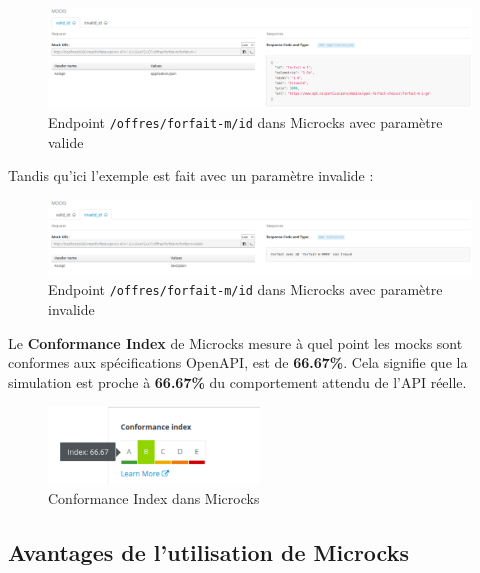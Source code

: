 \documentclass[11pt]{article}
\begin{document}
		\begin{figure}[H]
			\centering
			\includegraphics[width=\textwidth]{asset/mock_forfaitm.png}
			\caption{Endpoint \texttt{/offres/forfait-m/{id}} dans Microcks avec paramètre valide}
			\label{fig:endpoint-offres/forfait-m/{id}}
		\end{figure}
		
		Tandis qu'ici l'exemple est fait avec un paramètre invalide :
		
			\begin{figure}[H]
			\centering
			\includegraphics[width=\textwidth]{asset/microcks_invalid.png}
			\caption{Endpoint \texttt{/offres/forfait-m/{id}} dans Microcks avec paramètre invalide}
			\label{fig:endpoint-offres/forfait-m/{id}}
		\end{figure}
		
		Le \textbf{Conformance Index} de Microcks mesure à quel point les mocks sont conformes aux spécifications OpenAPI, est de \textbf{66.67\%}. Cela signifie que la simulation est proche à \textbf{66.67\%} du comportement attendu de l'API réelle.
		
		\begin{figure}[H]
			\centering
			\includegraphics[width=0.5\textwidth]{asset/conformance-index.png}
			\caption{Conformance Index dans Microcks}
			\label{fig:conformance-index}
		\end{figure}
		
		\subsection*{Avantages de l'utilisation de Microcks}
		
\end{document}
